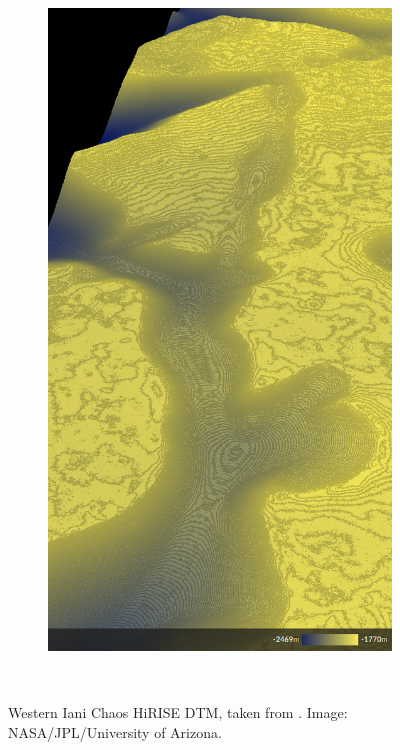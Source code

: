 \begin{figure}[h]
\begin{subfigure}[t]{\subfigureWidth}
        \label{fig:sub:western-iani-chaos-dtm}
    \end{subfigure}\hfill
    \begin{subfigure}[t]{\subfigureWidth}
        \centering
        \includegraphics[height=\graphicsHeight]{sections/mission-sites/images/western-iani-chaos-dtm-altimetry.png}
		\label{fig:sub:western-iani-chaos-dtm-altimetry}
	\end{subfigure}\\[0.8ex]
    \caption[Western Iani Chaos \ac{HiRISE} \ac{DTM}]
            {Western Iani Chaos \ac{HiRISE} \ac{DTM}, taken from . Image: \ac{NASA}/\ac{JPL}/University of Arizona.}
    \label{fig:western-iani-chaos}
\vspace{-2ex}
\end{figure}

